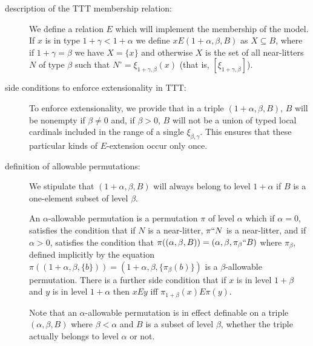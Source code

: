 \documentclass[12pt]{article}
\begin{document}
\begin{description}
\item[description of the TTT membership relation:]

We define a relation $E$ which will implement the membership of the model.   If $x$ is in type $1+\gamma<1+\alpha$ we define
$x E (1+\alpha,\beta,B)$ as $X \subseteq B$, where if $1+\gamma=\beta$ we have $X = \{x\}$ and otherwise $X$ is the set of all near-litters $N$ of type $\beta$ such that
$N^{\circ}=\xi_{1+\gamma,\beta}(x)$ (that is, $[\xi_{1+\gamma,\beta}]$).

\item[side conditions to enforce extensionality in TTT:]

To enforce extensionality, we provide that in a triple $(1+\alpha,\beta,B)$, $B$ will be nonempty if $\beta \neq 0$ and, if $\beta>0$, $B$ will not be a union of typed local cardinals included in the range of a single $\xi_{\beta,\gamma}$.  This ensures that these particular kinds of $E$-extension occur only once.

\item[definition of allowable permutations:]

We stipulate that $(1+\alpha,\beta,B)$ will always belong to level $1+\alpha$ if $B$ is a one-element subset of level $\beta$.

An $\alpha$-allowable permutation is a permutation $\pi$ of level $\alpha$ which if $\alpha=0$, satisfies the condition that if $N$ is a near-litter, $\pi``N$ is a near-litter,
and if $\alpha>0$, satisfies the condition that $\pi((\alpha,\beta,B)) = (\alpha,\beta,\pi_{\beta}``B)$ where $\pi_{\beta}$, defined implicitly by the equation $\pi((1+\alpha,\beta,\{b\})) =(1+\alpha,\beta,\{\pi_{\beta}(b)\})$ is a $\beta$-allowable permutation.  There is a further side condition that if $x$ is in level $1+\beta$ and $y$ is in level $1+\alpha$ then $x E y$ iff
$\pi_{1+\beta}(x) E \pi(y)$.

Note that an  $\alpha$-allowable permutation is in effect definable on a triple $(\alpha,\beta,B)$ where $\beta<\alpha$ and $B$ is a subset of level $\beta$, whether the triple actually belongs to level $\alpha$ or not.


\end{description}
\end{document}
